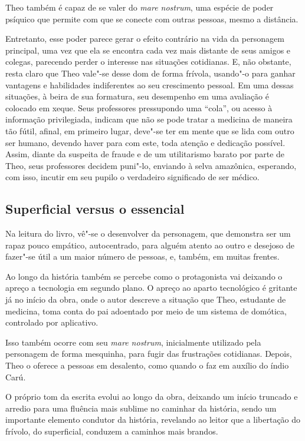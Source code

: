 \documentclass[12pt]{extarticle}
\begin{document}
Theo também é capaz de se valer do \emph{mare nostrum}, uma espécie de
poder psíquico que permite com que se conecte com outras pessoas, mesmo
a distância.

Entretanto, esse poder parece gerar o efeito contrário na vida da
personagem principal, uma vez que ela se encontra cada vez mais distante
de seus amigos e colegas, parecendo perder o interesse nas situações
cotidianas. E, não obstante, resta claro que Theo vale"-se desse dom de
forma frívola, usando"-o para ganhar vantagens e habilidades indiferentes
ao seu crescimento pessoal. Em uma dessas situações, à beira de sua
formatura, seu desempenho em uma avaliação é colocado em xeque. Seus
professores pressupondo uma ``cola'', ou acesso à informação
privilegiada, indicam que não se pode tratar a medicina de maneira tão
fútil, afinal, em primeiro lugar, deve"-se ter em mente que se lida com
outro ser humano, devendo haver para com este, toda atenção e dedicação
possível. Assim, diante da suspeita de fraude e de um utilitarismo
barato por parte de Theo, seus professores decidem puni"-lo, enviando à
selva amazônica, esperando, com isso, incutir em seu pupilo o verdadeiro
significado de ser médico.

\subsection{Superficial versus o essencial}

Na leitura do livro, vê"-se o desenvolver da personagem, que demonstra
ser um rapaz pouco empático, autocentrado, para alguém atento ao outro e
desejoso de fazer"-se útil a um maior número de pessoas, e, também, em
muitas frentes.

Ao longo da história também se percebe como o protagonista vai deixando
o apreço a tecnologia em segundo plano. O apreço ao aparto tecnológico é
gritante já no início da obra, onde o autor descreve a situação que
Theo, estudante de medicina, toma conta do pai adoentado por meio de um
sistema de domótica, controlado por aplicativo.

Isso também ocorre com seu \emph{mare nostrum}, inicialmente utilizado
pela personagem de forma mesquinha, para fugir das frustrações
cotidianas. Depois, Theo o oferece a pessoas em desalento, como quando o
faz em auxílio do índio Carú.

O próprio tom da escrita evolui ao longo da obra, deixando um início
truncado e arredio para uma fluência mais sublime no caminhar da
história, sendo um importante elemento condutor da história, revelando
ao leitor que a libertação do frívolo, do superficial, conduzem a
caminhos mais brandos.
\end{document}
